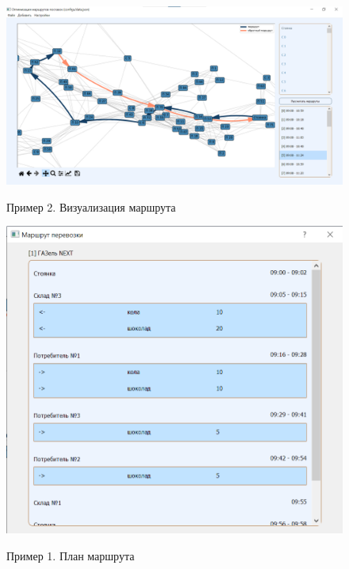 \vspace{100mm}

\begin{figure}[h!]
	\begin{center}
		{\includegraphics[scale=0.5, angle=0, page=1]{img/demo_routes_2.png}}
		\caption{Пример 2. Визуализация маршрута}
		\label{demo:routes2}
	\end{center}
\end{figure}

\pagebreak
\begin{figure}[h!]
	\begin{center}
		{\includegraphics[scale=0.6, angle=0, page=1]{img/demo_route_1.png}}
		\caption{Пример 1. План маршрута}
		\label{demo:route1}
	\end{center}
\end{figure}

